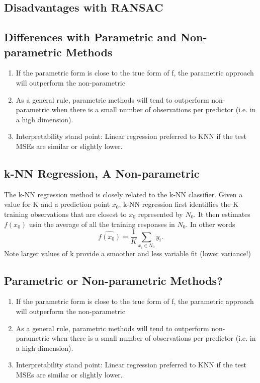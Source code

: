 \documentclass[12pt]{article}
\numberwithin{equation}{section}
\begin{document}
\subsection{Disadvantages with RANSAC}
\subsection{Differences with Parametric and Non-parametric Methods}
\begin{enumerate}
    \item If the parametric form is close to the true form of f, the parametric approach will outperform the non-parametric
    \item As a general rule, parametric methods will tend to outperform non-parametric when there is a small number of observations per predictor (i.e. in a high dimension).
    \item Interpretability stand point: Linear regression preferred to KNN if the test MSEs are similar or slightly lower.
\end{enumerate}
\subsection{k-NN Regression, A Non-parametric}
The k-NN regression method is closely related to the k-NN classifier. Given a value for K and a prediction point $x_0$, k-NN regression first identiffies the K training observations that are closest to $x_0$ represented by $N_0$. It then estimates $f(x_0)$ usin the average of all the training responses in $N_0$. In other words
\begin{equation}
    \hat{f(x_0)} = \frac{1}{K} \sum_{x_i \in N_0} y_i.
\end{equation}
Note larger values of k provide a smoother and less variable fit (lower variance!)
\subsection{Parametric or Non-parametric Methods?}
\begin{enumerate}
    \item  If the parametric form is close to the true form of f, the parametric approach will outperform the non-parametric
    \item As a general rule, parametric methods will tend to outperform non-parametric when there is a small number of observations per predictor (i.e. in a high dimension).
    \item Interpretability stand point: Linear regression preferred to KNN if the test MSEs are similar or slightly lower.
\end{enumerate}
\end{document}
